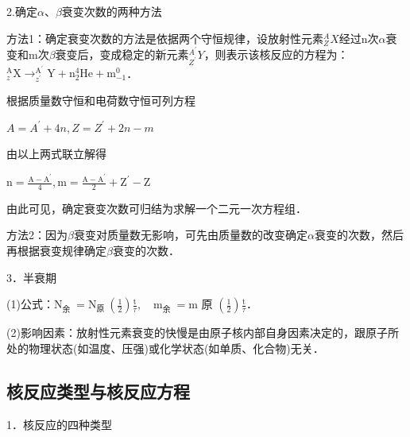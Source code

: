 2.确定$\alpha$、$\beta$衰变次数的两种方法

方法1：确定衰变次数的方法是依据两个守恒规律，设放射性元素$_{Z}^{A} X$经过n次$\alpha$衰变和m次$\beta$衰变后，变成稳定的新元素$_{Z^{\prime}}^{A^{\prime}} Y$，则表示该核反应的方程为：$_{z}^{\mathrm{A}} \mathrm{X} \longrightarrow_{z^{\prime}}^{\mathrm{A}^{\prime}} \mathrm{Y}+\mathrm{n}_{2}^{4} \mathrm{He}+\mathrm{m}_{-1}^{0}$．

根据质量数守恒和电荷数守恒可列方程

$A=A^{\prime}+4 n, Z=Z^{\prime}+2 n-m$

由以上两式联立解得

$\mathrm{n}=\frac{\mathrm{A}-\mathrm{A}^{\prime}}{4}, \mathrm{m}=\frac{\mathrm{A}-\mathrm{A}^{\prime}}{2}+\mathrm{Z}^{\prime}-\mathrm{Z}$

由此可见，确定衰变次数可归结为求解一个二元一次方程组．

方法2：因为$\beta$衰变对质量数无影响，可先由质量数的改变确定$\alpha$衰变的次数，然后再根据衰变规律确定$\beta$衰变的次数．

3．半衰期

(1)公式：$\mathrm{N}_{\text {余 }}=\mathrm{N}_{\text {原 }}\left(\frac{1}{2}\right) \frac{\mathrm{t}}{\tau}, \quad \mathrm{m}_{\text {余 }}=\mathrm{m}$ 原 $\left(\frac{1}{2}\right) \frac{\mathrm{t}}{\tau}$．

(2)影响因素：放射性元素衰变的快慢是由原子核内部自身因素决定的，跟原子所处的物理状态(如温度、压强)或化学状态(如单质、化合物)无关．

\newpage
\subsection{核反应类型与核反应方程}

1．核反应的四种类型

